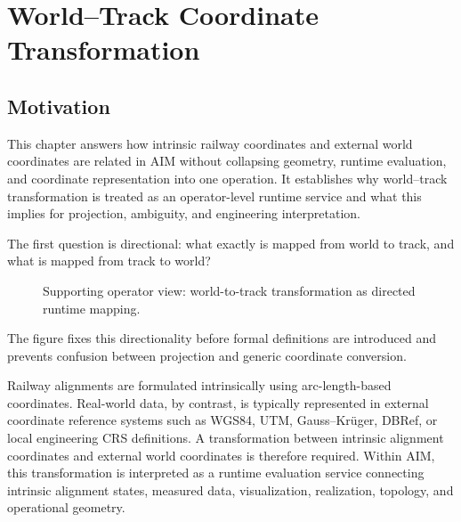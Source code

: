 
\chapter{World--Track Coordinate Transformation}

\label{chap:world-to-track}


\section*{Motivation}

This chapter answers how intrinsic railway coordinates and external
world coordinates are related in AIM without collapsing geometry,
runtime evaluation, and coordinate representation into one operation.
It establishes why world--track transformation is treated as an
operator-level runtime service and what this implies for projection,
ambiguity, and engineering interpretation.

The first question is directional: what exactly is mapped from world to
track, and what is mapped from track to world?

\begin{figure}[htbp]
\centering

\caption{Supporting operator view: world-to-track transformation as directed runtime mapping.}
\label{fig:world-to-track-transformation}
\end{figure}

The figure fixes this directionality before formal definitions are
introduced and prevents confusion between projection and generic
coordinate conversion.

Railway alignments are formulated intrinsically using arc-length-based
coordinates. Real-world data, by contrast, is typically represented in
external coordinate reference systems such as WGS84, UTM,
Gauss--Krüger, DBRef, or local engineering CRS definitions. A
transformation between intrinsic alignment coordinates and external world
coordinates is therefore required. Within AIM, this transformation is
interpreted as a runtime evaluation service connecting intrinsic
alignment states, measured data, visualization, realization, topology,
and operational geometry.

